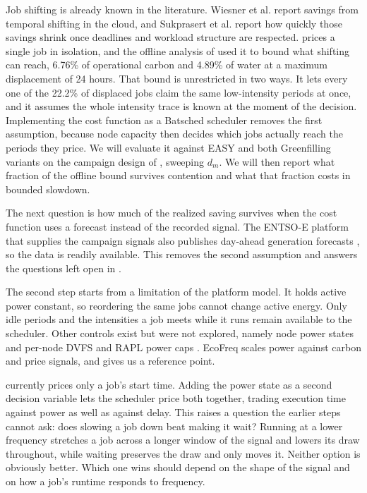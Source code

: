 Job shifting is already known in the literature. Wiesner et al. \parencite{wiesner2021Lets} report savings from temporal shifting in the cloud, and Sukprasert et al. \parencite{sukprasert2024Limitations} report how quickly those savings shrink once deadlines and workload structure are respected.  prices a single job in isolation, and the offline analysis of  used it to bound what shifting can reach, 6.76\% of operational carbon and 4.89\% of water at a maximum displacement of 24 hours. That bound is unrestricted in two ways. It lets every one of the 22.2\% of displaced jobs claim the same low-intensity periods at once, and it assumes the whole intensity trace is known at the moment of the decision. Implementing the cost function as a Batsched scheduler removes the first assumption, because node capacity then decides which jobs actually reach the periods they price. We will evaluate it against EASY and both Greenfilling variants on the campaign design of , sweeping $d_m$. We will then report what fraction of the offline bound survives contention and what that fraction costs in bounded slowdown.

The next question is how much of the realized saving survives when the cost function uses a forecast instead of the recorded signal. The ENTSO-E platform that supplies the campaign signals also publishes day-ahead generation forecasts \parencite{hirth2018ENTSOE}, so the data is readily available. This removes the second assumption and answers the questions left open in .

The second step starts from a limitation of the platform model. It holds active power constant, so reordering the same jobs cannot change active energy. Only idle periods and the intensities a job meets while it runs remain available to the scheduler. Other controls exist but were not explored, namely node power states and per-node DVFS and RAPL power caps \parencite{david2010RAPL}. EcoFreq \parencite{kozlov2024EcoFreq} scales power against carbon and price signals, and gives us a reference point.

 currently prices only a job's start time. Adding the power state as a second decision variable lets the scheduler price both together, trading execution time against power as well as against delay. This raises a question the earlier steps cannot ask: does slowing a job down beat making it wait? Running at a lower frequency stretches a job across a longer window of the signal and lowers its draw throughout, while waiting preserves the draw and only moves it. Neither option is obviously better. Which one wins should depend on the shape of the signal and on how a job's runtime responds to frequency.

